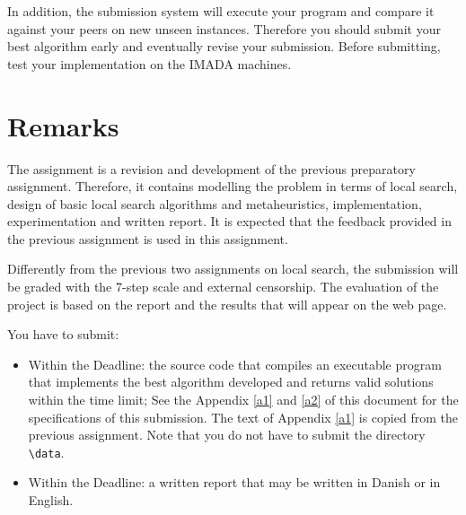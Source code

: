 In addition, the submission system will execute your program and compare
it against your peers on new unseen instances. Therefore you should
submit your best algorithm early and eventually revise your submission.
Before submitting, test your implementation on the IMADA machines.



\section*{Remarks}

\begin{remarks} 




\item The assignment is a revision and development of the previous
  preparatory assignment. Therefore, it contains modelling the problem
  in terms of local search, design of basic local search algorithms and
  metaheuristics, implementation, experimentation and written report.
  It is expected that the feedback provided in the previous assignment
  is used in this assignment.

%
  Differently from the previous two assignments on local search, the
  submission will be graded with the 7-step scale and external
  censorship.  The evaluation of the project is based on the report and
  the results that will appear on the web page.

\item You have to submit:

  \begin{itemize}
  \item Within the Deadline: the source code that compiles an executable
    program that implements the best algorithm developed and returns
    valid solutions within the time limit; See the Appendix \ref{a1} and
    \ref{a2} of this document for the specifications of this
    submission. The text of Appendix \ref{a1} is copied from the
    previous assignment. Note that you do not have to submit the
    directory \verb=\data=.


  \item Within the Deadline: a written report that may be written
    in Danish or in English. 
    \end{itemize} 


\end{remarks}
